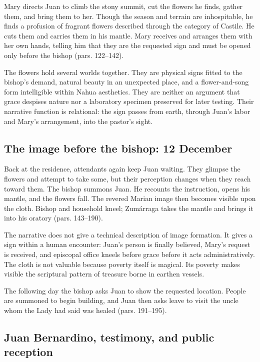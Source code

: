 Mary directs Juan to climb the stony summit, cut the flowers he finds, gather them, and bring them to her. Though the season and terrain are inhospitable, he finds a profusion of fragrant flowers described through the category of Castile. He cuts them and carries them in his mantle. Mary receives and arranges them with her own hands, telling him that they are the requested sign and must be opened only before the bishop (pars. 122--142).

The flowers hold several worlds together. They are physical signs fitted to the bishop's demand, natural beauty in an unexpected place, and a flower-and-song form intelligible within Nahua aesthetics. They are neither an argument that grace despises nature nor a laboratory specimen preserved for later testing. Their narrative function is relational: the sign passes from earth, through Juan's labor and Mary's arrangement, into the pastor's sight.

\subsection{The image before the bishop: 12 December}

Back at the residence, attendants again keep Juan waiting. They glimpse the flowers and attempt to take some, but their perception changes when they reach toward them. The bishop summons Juan. He recounts the instruction, opens his mantle, and the flowers fall. The revered Marian image then becomes visible upon the cloth. Bishop and household kneel; Zumárraga takes the mantle and brings it into his oratory (pars. 143--190).

The narrative does not give a technical description of image formation. It gives a sign within a human encounter: Juan's person is finally believed, Mary's request is received, and episcopal office kneels before grace before it acts administratively. The cloth is not valuable because poverty itself is magical. Its poverty makes visible the scriptural pattern of treasure borne in earthen vessels.

The following day the bishop asks Juan to show the requested location. People are summoned to begin building, and Juan then asks leave to visit the uncle whom the Lady had said was healed (pars. 191--195).

\subsection{Juan Bernardino, testimony, and public reception}

